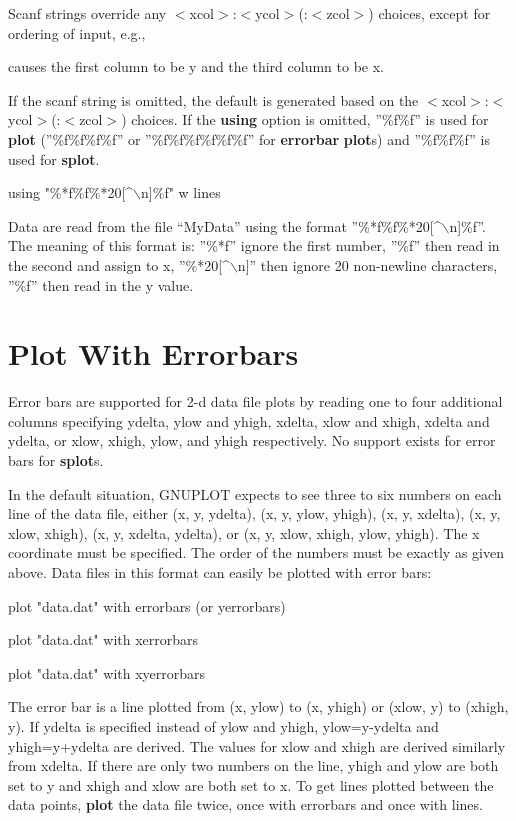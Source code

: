 Scanf strings override any $<$xcol$>$:$<$ycol$>$(:$<$zcol$>$) choices, except for
ordering of input, e.g.,


causes the first column to be y and the third column to be x.

If the scanf string is omitted, the default is generated based on the
$<$xcol$>$:$<$ycol$>$(:$<$zcol$>$) choices. If the {\bf using} option is omitted, ''\%f\%f''
is used for {\bf plot} (''\%f\%f\%f\%f'' or ''\%f\%f\%f\%f\%f\%f'' for {\bf 
errorbar} {\bf plot}s) and ''\%f\%f\%f'' is used for {\bf splot}.

 {using "\%*f\%f\%*20[^$\backslash$n]\%f" w lines}

Data are read from the file ``MyData'' using the format
''\%*f\%f\%*20[^$\backslash$n]\%f''. The meaning of this format is: ''\%*f'' ignore the
first number, ''\%f'' then read in the second and assign to x,
''\%*20[^$\backslash$n]'' then ignore 20 non-newline characters, ''\%f'' then read in
the y value.

\section{Plot With Errorbars}
Error bars are supported for 2-d data file plots by reading one to
four additional columns specifying ydelta, ylow and yhigh, xdelta,
xlow and xhigh, xdelta and ydelta, or xlow, xhigh, ylow, and yhigh
respectively. No support exists for error bars for {\bf splot}s.

In the default situation, GNUPLOT expects to see three to six
numbers on each line of the data file, either (x, y, ydelta),
(x, y, ylow, yhigh), (x, y, xdelta), (x, y, xlow, xhigh), 
(x, y, xdelta, ydelta), or (x, y, xlow, xhigh, ylow, yhigh). The x 
coordinate must be specified. The order of the numbers must be exactly 
as given above. Data files in this format can easily be plotted with error 
bars:

        plot "data.dat" with errorbars (or yerrorbars)

        plot "data.dat" with xerrorbars

        plot "data.dat" with xyerrorbars

The error bar is a line plotted from (x, ylow) to (x,
yhigh) or (xlow, y) to (xhigh, y). If ydelta is specified instead 
of ylow and yhigh, ylow=y-ydelta and yhigh=y+ydelta are derived. The
values for xlow and xhigh are derived similarly from xdelta. If there
are only two numbers on the line, yhigh and ylow are both set to
y and xhigh and xlow are both set to x. To get lines plotted between 
the data points, {\bf plot} the data file twice, once with errorbars and 
once with lines.

